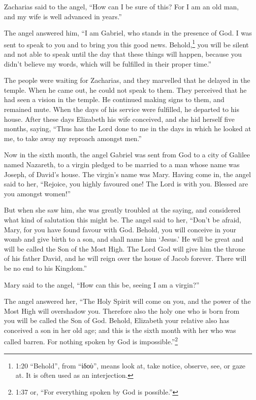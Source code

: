  Zacharias said to the angel, ``How can I be sure of this?
For I am an old man, and my wife is well advanced in years.''

 The angel answered him, ``I am Gabriel, who stands in the
presence of God. I was sent to speak to you and to bring you this good
news.  Behold,\footnote{1:20 ``Behold'', from ``ἰδοὺ'',
  means look at, take notice, observe, see, or gaze at. It is often used
  as an interjection.} you will be silent and not able to speak until
the day that these things will happen, because you didn't believe my
words, which will be fulfilled in their proper time.''

 The people were waiting for Zacharias, and they marvelled
that he delayed in the temple.  When he came out, he could
not speak to them. They perceived that he had seen a vision in the
temple. He continued making signs to them, and remained mute.
 When the days of his service were fulfilled, he departed
to his house.  After these days Elizabeth his wife
conceived, and she hid herself five months, saying,  ``Thus
has the Lord done to me in the days in which he looked at me, to take
away my reproach amongst men.''

 Now in the sixth month, the angel Gabriel was sent from
God to a city of Galilee named Nazareth,  to a virgin
pledged to be married to a man whose name was Joseph, of David's house.
The virgin's name was Mary.  Having come in, the angel said
to her, ``Rejoice, you highly favoured one! The Lord is with you.
Blessed are you amongst women!''

 But when she saw him, she was greatly troubled at the
saying, and considered what kind of salutation this might be.
 The angel said to her, ``Don't be afraid, Mary, for you
have found favour with God.  Behold, you will conceive in
your womb and give birth to a son, and shall name him `Jesus.'
 He will be great and will be called the Son of the Most
High. The Lord God will give him the throne of his father David,
 and he will reign over the house of Jacob forever. There
will be no end to his Kingdom.''

 Mary said to the angel, ``How can this be, seeing I am a
virgin?''

 The angel answered her, ``The Holy Spirit will come on
you, and the power of the Most High will overshadow you. Therefore also
the holy one who is born from you will be called the Son of God.
 Behold, Elizabeth your relative also has conceived a son
in her old age; and this is the sixth month with her who was called
barren.  For nothing spoken by God is
impossible.''\footnote{1:37 or, ``For everything spoken by God is
  possible.''}

